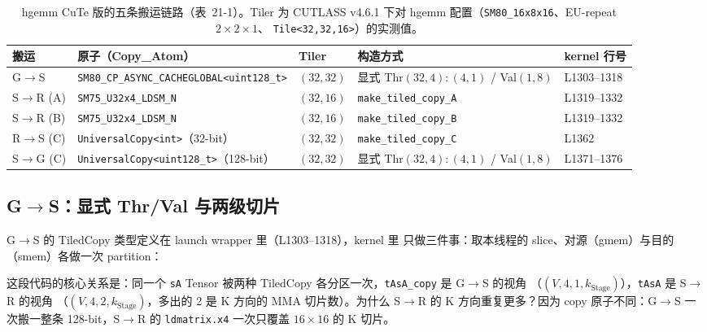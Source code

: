 \begin{table}[htbp]
\centering
\footnotesize
\begin{tabular}{@{}lllll@{}}
  \toprule
  搬运 & 原子（Copy\_Atom） & Tiler & 构造方式 & kernel 行号 \\
  \midrule
  G$\to$S & \texttt{SM80\_\allowbreak{}CP\_\allowbreak{}ASYNC\_\allowbreak{}CACHEGLOBAL\allowbreak{}<uint128\_\allowbreak{}t>} & $(32,32)$
    & 显式 Thr$(32,4){:}(4,1)$ / Val$(1,8)$ & L1303--1318 \\
  S$\to$R (A) & \texttt{SM75\_\allowbreak{}U32x4\_\allowbreak{}LDSM\_\allowbreak{}N} & $(32,16)$
    & \texttt{make\_\allowbreak{}tiled\_\allowbreak{}copy\_\allowbreak{}A} & L1319--1332 \\
  S$\to$R (B) & \texttt{SM75\_\allowbreak{}U32x4\_\allowbreak{}LDSM\_\allowbreak{}N} & $(32,16)$
    & \texttt{make\_\allowbreak{}tiled\_\allowbreak{}copy\_\allowbreak{}B} & L1319--1332 \\
  R$\to$S (C) & \texttt{Universal\allowbreak{}Copy\allowbreak{}<int>}（32-bit） & $(32,32)$
    & \texttt{make\_\allowbreak{}tiled\_\allowbreak{}copy\_\allowbreak{}C} & L1362 \\
  S$\to$G (C) & \texttt{Universal\allowbreak{}Copy\allowbreak{}<uint128\_\allowbreak{}t>}（128-bit） & $(32,32)$
    & 显式 Thr$(32,4){:}(4,1)$ / Val$(1,8)$ & L1371--1376 \\
  \bottomrule
\end{tabular}
\caption{hgemm CuTe 版的五条搬运链路（表~21-1）。Tiler 为 CUTLASS v4.6.1
下对 hgemm 配置（\texttt{SM80\_\allowbreak{}16x8x16}、EU-repeat $2\times2\times1$、
\texttt{Tile\allowbreak{}<32,\allowbreak{}32,\allowbreak{}16>}）的实测值。}\label{tab:21-1}
\end{table}

\subsection{G$\to$S：显式 Thr/Val 与两级切片}

G$\to$S 的 TiledCopy 类型定义在 launch wrapper 里（L1303--1318），kernel 里
只做三件事：取本线程的 slice、对源（gmem）与目的（smem）各做一次 partition：



这段代码的核心关系是：同一个 \texttt{sA} Tensor 被两种
TiledCopy 各分区一次，\texttt{tAsA\_copy} 是 G$\to$S 的视角
（$(V,4,1,k_{\mathrm{Stage}})$），\texttt{tAsA} 是 S$\to$R 的视角
（$(V,4,2,k_{\mathrm{Stage}})$，多出的 2 是 K 方向的 MMA 切片数）。为什么
S$\to$R 的 K 方向重复更多？因为 copy 原子不同：G$\to$S 一次搬一整条
128-bit，S$\to$R 的 \texttt{ldmatrix.x4} 一次只覆盖 $16\times16$ 的 K 切片。

